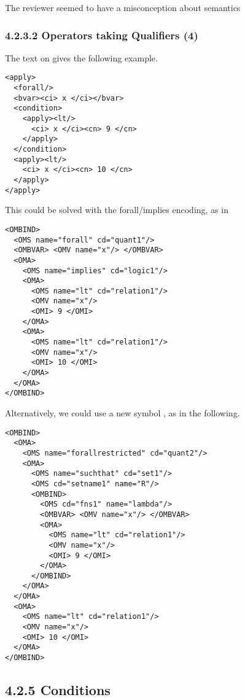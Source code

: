\documentclass{llncs}
\begin{document}
\begin{newpart}{The reviewer seemed to have a misconception about semantics}
\subsubsection{4.2.3.2 Operators taking Qualifiers (4)}\label{42324}
The text on {} gives the following example.
\begin{lstlisting}[language=MathML2]
<apply>
  <forall/>
  <bvar><ci> x </ci></bvar>
  <condition>
    <apply><lt/>
      <ci> x </ci><cn> 9 </cn>
    </apply>
  </condition>
  <apply><lt/>
    <ci> x </ci><cn> 10 </cn>
  </apply>
</apply>
\end{lstlisting}
This could be solved with the forall/implies encoding, as in
\begin{lstlisting}
<OMBIND>
  <OMS name="forall" cd="quant1"/>
  <OMBVAR> <OMV name="x"/> </OMBVAR>
  <OMA>
    <OMS name="implies" cd="logic1"/>
    <OMA>
      <OMS name="lt" cd="relation1"/>
      <OMV name="x"/> 
      <OMI> 9 </OMI>
    </OMA>
    <OMA>
      <OMS name="lt" cd="relation1"/>
      <OMV name="x"/> 
      <OMI> 10 </OMI>
    </OMA>
  </OMA>
</OMBIND>
\end{lstlisting}
Alternatively, we could use a new symbol {},  as in the
following.
\begin{lstlisting}
<OMBIND>
  <OMA>
    <OMS name="forallrestricted" cd="quant2"/>
    <OMA>
      <OMS name="suchthat" cd="set1"/>
      <OMS cd="setname1" name="R"/>
      <OMBIND>
        <OMS cd="fns1" name="lambda"/>
        <OMBVAR> <OMV name="x"/> </OMBVAR>
        <OMA>
          <OMS name="lt" cd="relation1"/>
          <OMV name="x"/> 
          <OMI> 9 </OMI>
        </OMA>
      </OMBIND>
    </OMA>
  </OMA>
  <OMA>
    <OMS name="lt" cd="relation1"/>
    <OMV name="x"/> 
    <OMI> 10 </OMI>
  </OMA>
</OMBIND>
\end{lstlisting}
\subsection{4.2.5 Conditions}\label{425}

\end{newpart}
\end{document}
